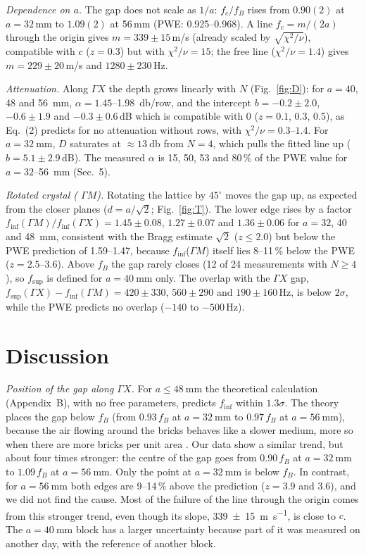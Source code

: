 \documentclass[9pt,a4paper,twocolumn]{extarticle}
\newcommand{\umm}{\milli\metre}
\newcommand{\udB}{\decibel}
\newcommand{\ums}{\metre\per\second}
\newcommand{\GX}{\ensuremath{\Gamma X}}
\newcommand{\GM}{\ensuremath{\Gamma M}}
\newcommand{\finf}{\ensuremath{f_{\mathrm{inf}}}}
\newcommand{\fsup}{\ensuremath{f_{\mathrm{sup}}}}
\begin{document}
\emph{Dependence on $a$.} The gap does not scale as $1/a$: $f_c/f_B$ rises from $0.90(2)$ at
$a=32$\,mm to $1.09(2)$ at 56\,mm (PWE: 0.925--0.968). A line $f_c=m/(2a)$ through the origin gives
$m=339\pm15$\,m/s (already scaled by $\sqrt{\chi^2/\nu}$), compatible with $c$ ($z=0.3$) but with
$\chi^2/\nu=15$; the free line ($\chi^2/\nu=1.4$) gives $m=229\pm20$\,m/s and $1280\pm230$\,Hz.

\emph{Attenuation.} Along \GX{} the depth grows linearly with $N$ (Fig.~\ref{fig:D}): for $a=40$, 48
and \SI{56}{\umm}, $\alpha=1.45$--\SI{1.98}{\udB}/row, and the intercept $b=-0.2\pm2.0$, $-0.6\pm1.9$ and
$-0.3\pm0.6$\,dB which is compatible with 0 ($z=0.1$, 0.3, 0.5), as Eq.~(2) predicts for no attenuation without
rows, with $\chi^2/\nu=0.3$--$1.4$. For $a=\SI{32}{\umm}$, $D$ saturates at $\approx\SI{13}{\udB}$ from $N=4$,
which pulls the fitted line up ($b=5.1\pm2.9$\,dB). The measured $\alpha$ is 15, 50, 53 and 80\,\% of the
PWE value for $a=32$--\SI{56}{\umm} (Sec.~5).

\emph{Rotated crystal ( \GM).} Rotating the lattice by $45^\circ$ moves the gap up, as expected from the
closer planes ($d=a/\sqrt2$; Fig.~\ref{fig:T}). The lower edge rises by a factor
$\finf(\GM)/\finf(\GX)=1.45\pm0.08$, $1.27\pm0.07$ and $1.36\pm0.06$ for $a=32$, 40 and \SI{48}{\umm}, consistent with
the Bragg estimate $\sqrt2$ ($z\le2.0$) but below the PWE prediction of 1.59--1.47, because \finf(\GM) itself
lies 8--11\,\% below the PWE ($z=2.5$--3.6). Above $f_B$ the gap rarely closes (12 of 24 measurements with
$N\ge4$), so $\fsup$ is defined for $a=\SI{40}{\umm}$ only. The overlap with the \GX{} gap,
$\fsup(\GX)-\finf(\GM)=420\pm330$, $560\pm290$ and $190\pm160$\,Hz, is below $2\sigma$, while the PWE
predicts no overlap ($-140$ to $-500$\,Hz).


\section{Discussion}
\emph{Position of the gap along \GX.} For $a\le\SI{48}{\umm}$ the theoretical calculation (Appendix~B), with no free parameters, predicts \finf{} within $1.3\sigma$. The theory places the gap below $f_B$ (from $0.93\,f_B$ at $a=\SI{32}{\umm}$ to $0.97\,f_B$ at $a=\SI{56}{\umm}$), because the air flowing around the bricks behaves like a slower medium, more so when there are more bricks per unit area \cite{krokhin}. Our data show a similar trend, but about four times stronger: the centre of the gap goes from $0.90\,f_B$ at $a=\SI{32}{\umm}$ to $1.09\,f_B$ at $a=\SI{56}{\umm}$. Only the point at $a=\SI{32}{\umm}$ is below $f_B$. In contrast, for $a=\SI{56}{\umm}$ both edges are 9--14\,\% above the prediction ($z=3.9$ and 3.6), and we did not find the cause. Most of the failure of the line through the origin comes from this stronger trend, even though its slope, \SI{339\pm15}{\ums}, is close to $c$. The $a=\SI{40}{\umm}$ block has a larger uncertainty because part of it was measured on another day, with the reference of another block.
\end{document}
